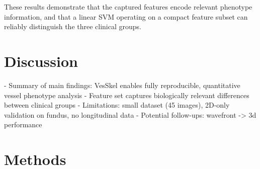 \documentclass[11pt]{article}
\begin{document}
These results demonstrate that the captured features encode relevant
phenotype information, and that a linear SVM operating on a compact
feature subset can reliably distinguish the three clinical groups.

\section{Discussion}\label{sec:discussion}

%

- Summary of main findings: VesSkel enables fully reproducible,
quantitative vessel phenotype analysis
- Feature set captures biologically relevant differences between clinical groups
- Limitations: small dataset (45 images), 2D-only validation on
fundus, no longitudinal data
- Potential follow-ups: wavefront -> 3d performance

\section{Methods}\label{sec:methods}
\end{document}
